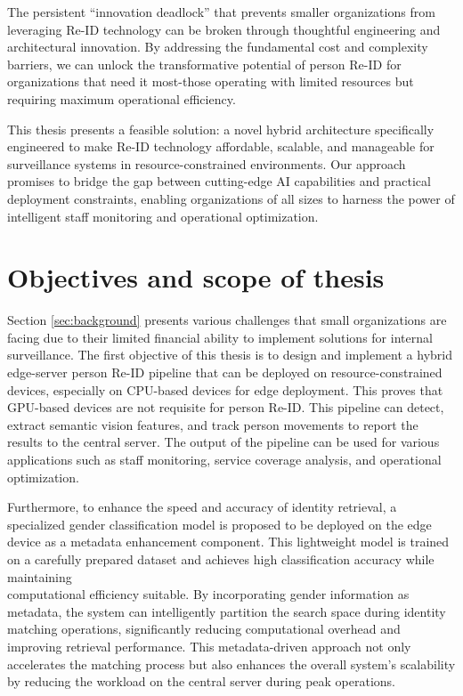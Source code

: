 \documentclass[../main.tex]{subfiles}
\begin{document}
The persistent ``innovation deadlock'' that prevents smaller organizations from leveraging Re-ID technology can be broken through thoughtful engineering and architectural innovation. By addressing the fundamental cost and complexity barriers, we can unlock the transformative potential of person Re-ID for organizations that need it most-those operating with limited resources but requiring maximum operational efficiency.

This thesis presents a feasible solution: a novel hybrid architecture specifically engineered to make Re-ID technology affordable, scalable, and manageable for surveillance systems in resource-constrained environments. Our approach promises to bridge the gap between cutting-edge AI capabilities and practical deployment constraints, enabling organizations of all sizes to harness the power of intelligent staff monitoring and operational optimization.

\section{Objectives and scope of thesis} 
\label{sec:objectives}

Section \ref{sec:background} presents various challenges that small organizations are facing due to their limited financial ability to implement solutions for internal surveillance. The first objective of this thesis is to design and implement a hybrid edge-server person Re-ID pipeline that can be deployed on resource-constrained devices, especially on CPU-based devices for edge deployment. This proves that GPU-based devices are not requisite for person Re-ID. This pipeline can detect, extract semantic vision features, and track person movements to report the results to the central server. The output of the pipeline can be used for various applications such as staff monitoring, service coverage analysis, and operational optimization.

Furthermore, to enhance the speed and accuracy of identity retrieval, a specialized gender classification model is proposed to be deployed on the edge device as a metadata enhancement component. This lightweight model is trained on a carefully prepared dataset and achieves high classification accuracy while maintaining\\ computational efficiency suitable. By incorporating gender information as metadata, the system can intelligently partition the search space during identity matching operations, significantly reducing computational overhead and improving retrieval performance. This metadata-driven approach not only accelerates the matching process but also enhances the overall system's scalability by reducing the workload on the central server during peak operations.
\end{document}
